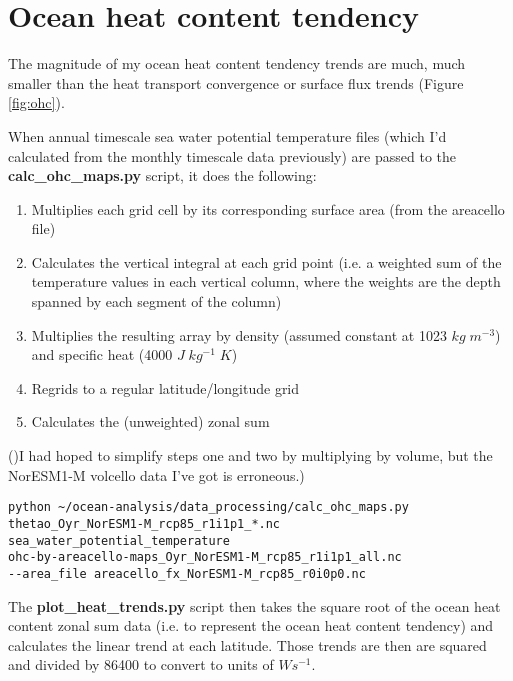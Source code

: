 \section{Ocean heat content tendency}

The magnitude of my ocean heat content tendency trends are much, much smaller than the heat transport convergence or surface flux trends (Figure \ref{fig:ohc}). 

When annual timescale sea water potential temperature files (which I'd calculated from the monthly timescale data previously) are passed to the \textbf{calc_ohc_maps.py} script, it does the following:
\begin{enumerate}
\item Multiplies each grid cell by its corresponding surface area (from the areacello file)
\item Calculates the vertical integral at each grid point (i.e. a weighted sum of the temperature values in each vertical column, where the weights are the depth spanned by each segment of the column)
\item Multiplies the resulting array by density (assumed constant at 1023 $kg\; m^{-3}$) and specific heat (4000 $J\; kg^{-1}\; K$)
\item Regrids to a regular latitude/longitude grid
\item Calculates the (unweighted) zonal sum
\end{enumerate}

()I had hoped to simplify steps one and two by multiplying by volume, but the NorESM1-M volcello data I've got is erroneous.) 

\begin{verbatim}
python ~/ocean-analysis/data_processing/calc_ohc_maps.py 
thetao_Oyr_NorESM1-M_rcp85_r1i1p1_*.nc 
sea_water_potential_temperature 
ohc-by-areacello-maps_Oyr_NorESM1-M_rcp85_r1i1p1_all.nc 
--area_file areacello_fx_NorESM1-M_rcp85_r0i0p0.nc
\end{verbatim}

The \textbf{plot_heat_trends.py} script then takes the square root of the ocean heat content zonal sum data (i.e. to represent the ocean heat content tendency) and calculates the linear trend at each latitude. Those trends are then are squared and divided by 86400 to convert to units of $Ws^{-1}$. 
